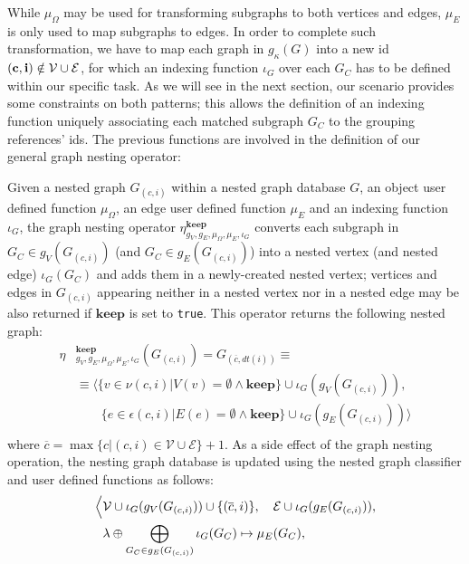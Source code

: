 While $\mu_\Omega$ may be used for transforming subgraphs to both vertices and edges, $\mu_E$ is only used to map subgraphs to edges.  
In order to complete such transformation, we have to map each graph in $g_\kappa(G)$ into a new id $(\textbf{c},\textbf{i})\notin \mathcal{V}\cup \mathcal{E}$, for which an indexing function $\iota_G$ over each $G_C$ has to be defined within our specific task. As we will see in the next section, our scenario provides some constraints on both patterns; this allows the definition of an indexing function  uniquely associating each matched subgraph  $G_C$  to the grouping references' ids.
The previous functions are involved in the definition of our general graph nesting operator:



\begin{definition}
Given a nested graph $G_{(c,i)}$ within a nested graph database $G$, an object user defined function $\mu_\Omega$, an edge user defined function $\mu_E$ and an indexing function $\iota_G$, the graph nesting operator $\eta_{g_V,g_E,\mu_\Omega,\mu_E,\iota_G}^{\textbf{keep}}$ converts each subgraph in $G_C\in g_V(G_{(c,i)})$ (and $G_C\in g_E(G_{(c,i)})$) into a nested vertex (and nested edge) $\iota_G(G_C)$ and adds them in a newly-created nested vertex; vertices and edges in $G_{(c,i)}$ appearing neither in a nested vertex nor in a nested edge may be also returned if $\textbf{keep}$ is set to \texttt{true}. This operator returns the following nested graph:
\[\begin{split}
\eta&{}_{g_V,g_E,\mu_\Omega,\mu_E,\iota_G}^{\textbf{keep}}(G_{(c,i)})=G_{(\overline{c},dt(i))}\equiv\\
&\equiv\Big\langle \{v\in \nu(c,i) | V(v)=\emptyset\wedge\textbf{keep} \}\cup \iota_G(g_V(G_{(c,i)})),\\
&\qquad \{e\in \epsilon(c,i) | E(e)=\emptyset\wedge\textbf{keep} \}\cup \iota_G(g_E(G_{(c,i)}))\Big\rangle\\
\end{split}\]
where $\overline{c}=\max\{c|(c,i)\in\mathcal{V}\cup\mathcal{E}\}+1$. As a side effect of the graph nesting operation, the nesting graph database is updated using the nested graph classifier and user defined functions as follows:
	\begin{align*}
	\Big\langle&\VS\cup \iota_G(g_V(G_{(c,i)}))\cup\{(\overline{c},i)\},\quad \ES\cup \iota_G(g_E(G_{(c,i)})),\\
	& \lambda\oplus \bigoplus_{G_C\in g_E(G_{(c,i)})}\iota_G(G_C)\mapsto \mu_E(G_C),\\

\end{align*}
\end{definition}
